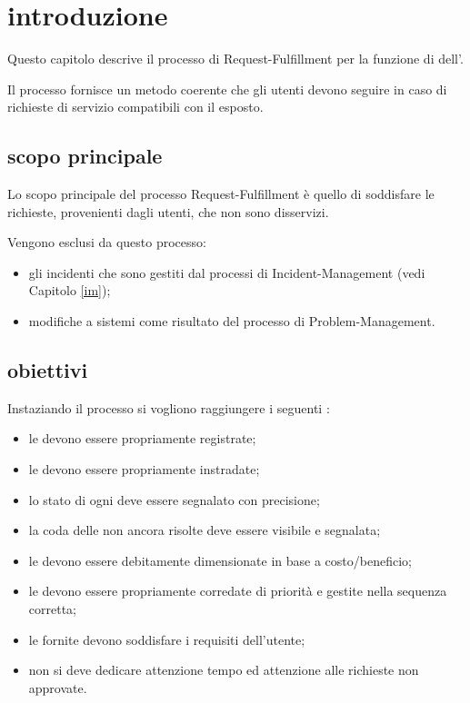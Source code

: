 %
%
\section[Introduzione]{introduzione}
\label{rf-introduction}
Questo capitolo descrive il processo di \acf{Request-Fulfillment} per la funzione di  dell'\entity{}.

Il processo fornisce un metodo coerente che gli utenti devono seguire in caso di richieste di servizio compatibili con il  esposto.

\subsection[Scopo principale]{scopo principale}
\label{rf-introduction-scope}
Lo scopo principale del processo \acf{Request-Fulfillment} è quello di soddisfare le richieste, provenienti dagli utenti, che non sono disservizi.

Vengono esclusi da questo processo:

\begin{itemize}
\item{gli incidenti che sono gestiti dal processi di \ac{Incident-Management} (vedi Capitolo \ref{im});}
\item{modifiche a sistemi come risultato del processo di \ac{Problem-Management}.}
\end{itemize}

\subsection[Obiettivi]{obiettivi}
\label{rf-introduction-objectives}
Instaziando il processo si vogliono raggiungere i seguenti :

\begin{itemize}
\item{le  devono essere propriamente registrate;}
\item{le  devono essere propriamente instradate;}
\item{lo stato di ogni  deve essere segnalato con precisione;}
\item{la coda delle  non ancora risolte deve essere visibile e segnalata;}
\item{le  devono essere debitamente dimensionate in base a costo/beneficio;}
\item{le  devono essere propriamente corredate di priorità e gestite nella sequenza corretta;}
\item{le  fornite devono soddisfare i requisiti dell'utente;}
\item{non si deve dedicare attenzione tempo ed attenzione alle richieste non approvate.}
\end{itemize}

